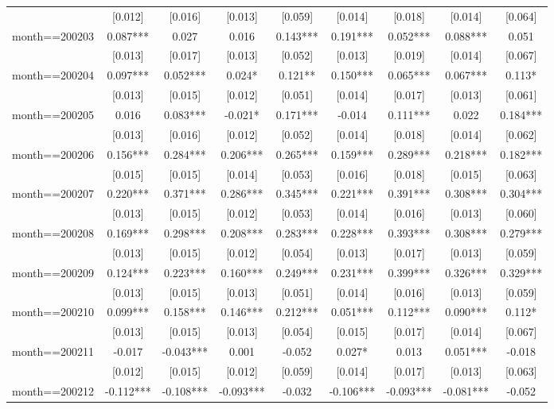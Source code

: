 \documentclass[]{article}
\begin{document}
\begin{tabular}{lcccccccc}
 & [0.012] & [0.016] & [0.013] & [0.059] & [0.014] & [0.018] & [0.014] & [0.064] \\
month==200203 & 0.087*** & 0.027 & 0.016 & 0.143*** & 0.191*** & 0.052*** & 0.088*** & 0.051 \\
 & [0.013] & [0.017] & [0.013] & [0.052] & [0.013] & [0.019] & [0.014] & [0.067] \\
month==200204 & 0.097*** & 0.052*** & 0.024* & 0.121** & 0.150*** & 0.065*** & 0.067*** & 0.113* \\
 & [0.013] & [0.015] & [0.012] & [0.051] & [0.014] & [0.017] & [0.013] & [0.061] \\
month==200205 & 0.016 & 0.083*** & -0.021* & 0.171*** & -0.014 & 0.111*** & 0.022 & 0.184*** \\
 & [0.013] & [0.016] & [0.012] & [0.052] & [0.014] & [0.018] & [0.014] & [0.062] \\
month==200206 & 0.156*** & 0.284*** & 0.206*** & 0.265*** & 0.159*** & 0.289*** & 0.218*** & 0.182*** \\
 & [0.015] & [0.015] & [0.014] & [0.053] & [0.016] & [0.018] & [0.015] & [0.063] \\
month==200207 & 0.220*** & 0.371*** & 0.286*** & 0.345*** & 0.221*** & 0.391*** & 0.308*** & 0.304*** \\
 & [0.013] & [0.015] & [0.012] & [0.053] & [0.014] & [0.016] & [0.013] & [0.060] \\
month==200208 & 0.169*** & 0.298*** & 0.208*** & 0.283*** & 0.228*** & 0.393*** & 0.308*** & 0.279*** \\
 & [0.013] & [0.015] & [0.012] & [0.054] & [0.013] & [0.017] & [0.013] & [0.059] \\
month==200209 & 0.124*** & 0.223*** & 0.160*** & 0.249*** & 0.231*** & 0.399*** & 0.326*** & 0.329*** \\
 & [0.013] & [0.015] & [0.013] & [0.051] & [0.014] & [0.016] & [0.013] & [0.059] \\
month==200210 & 0.099*** & 0.158*** & 0.146*** & 0.212*** & 0.051*** & 0.112*** & 0.090*** & 0.112* \\
 & [0.013] & [0.015] & [0.013] & [0.054] & [0.015] & [0.017] & [0.014] & [0.067] \\
month==200211 & -0.017 & -0.043*** & 0.001 & -0.052 & 0.027* & 0.013 & 0.051*** & -0.018 \\
 & [0.012] & [0.015] & [0.012] & [0.059] & [0.014] & [0.017] & [0.013] & [0.063] \\
month==200212 & -0.112*** & -0.108*** & -0.093*** & -0.032 & -0.106*** & -0.093*** & -0.081*** & -0.052 \\

\end{tabular}
\end{document}
